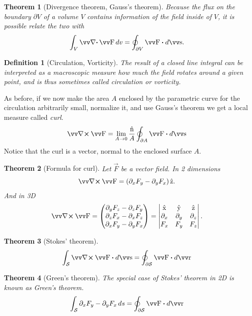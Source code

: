 \documentclass[twocolumn, margin=small]{tex/hsrzf}
\theoremstyle{fuvarzf}
\newtheorem{theorem}{Theorem}
\newtheorem{definition}{Definition}
\begin{document}
\begin{theorem}[Divergence theorem, Gauss's theorem]
  Because the flux on the boundary \(\partial V\) of a volume \(V\) contains
  information of the field inside of \(V\), it is possible relate the two with
  \[
    \int_V \div \vec{F} \,dv = \oint_{\partial V} \vec{F} \dotp d\vec{s} .
  \]
\end{theorem}

\begin{definition}[Circulation, Vorticity]
  The result of a closed line integral can be interpreted as a macroscopic
  measure how much the field rotates around a given point, and is thus
  sometimes called \emph{circulation} or \emph{vorticity}.
\end{definition}

As before, if we now make the area \(A\) enclosed by the parametric curve for
the circulation arbitrarily small, normalize it, and use Gauss's theorem we get
a local measure called \emph{curl}.
\[
  \curl \vec{F} =
  \lim_{A\to 0} \frac{\uvec{n}}{A} \oint_{\partial A} \vec{F} \dotp d\vec{s}
\]
Notice that the curl is a vector, normal to the enclosed surface \(A\).

\begin{theorem}[Formula for curl]
  Let \(\vec{F}\) be a vector field. In 2 dimensions
  \[
    \curl \vec{F} = \left(\partial_x F_y - \partial_y F_x\right)\uvec{z}.
  \]
  And in 3D
  \[
    \curl \vec{F} = \begin{pmatrix}
      \partial_y F_z - \partial_z F_y \\
      \partial_z F_x - \partial_x F_z \\
      \partial_x F_y - \partial_y F_x
    \end{pmatrix}
    = \begin{vmatrix}
      \uvec{x} & \uvec{y} & \uvec{z} \\
      \partial_x & \partial_y & \partial_z \\
      F_x & F_y & F_z
    \end{vmatrix} .
  \]
\end{theorem}

\begin{theorem}[Stokes' theorem]
  \[
    \int_\mathcal{S} \curl \vec{F} \dotp d\vec{s}
    = \oint_{\partial\mathcal{S}} \vec{F} \dotp d\vec{r}
  \]
\end{theorem}

\begin{theorem}[Green's theorem]
  The special case of Stokes' theorem in 2D is known as Green's theorem.
  \[
    \int_\mathcal{S} \partial_x F_y - \partial_y F_x \,ds
    = \oint_{\partial\mathcal{S}} \vec{F} \dotp d\vec{r}
  \]
\end{theorem}
\end{document}
